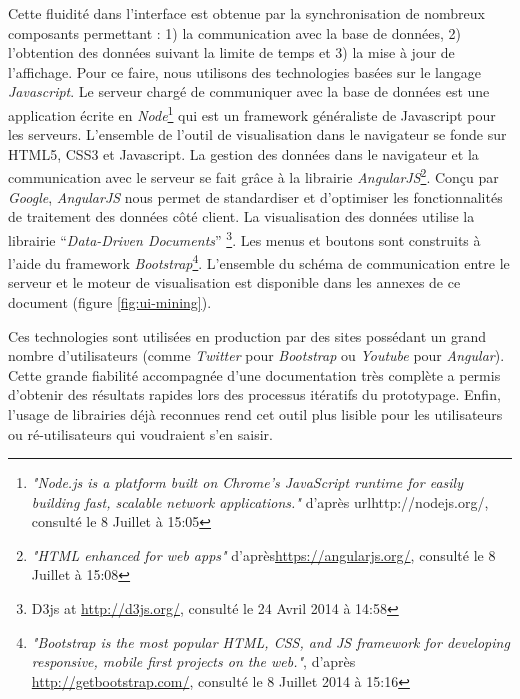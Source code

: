     Cette fluidité dans l'interface est obtenue par la  synchronisation de nombreux composants permettant : 1) la communication avec la base de données, 2) l'obtention des données suivant la limite de temps et 3) la mise à jour de l'affichage. Pour ce faire, nous utilisons des technologies basées sur le langage \textit{Javascript}. Le serveur chargé de communiquer avec la base de données est une application écrite en \textit{Node}\footnote{ \textit{"Node.js is a platform built on Chrome's JavaScript runtime for easily building fast, scalable network applications."} d'après url{http://nodejs.org/}, consulté le 8 Juillet à 15:05} qui est un framework généraliste de Javascript pour les serveurs. L{\textquoteright}ensemble de l{\textquoteright}outil de visualisation dans le navigateur se fonde sur HTML5, CSS3 et Javascript. La gestion des données dans le navigateur et la communication avec le serveur se fait grâce à la librairie \textit{AngularJS}\footnote{\textit{"HTML enhanced for web apps"} d'après\url{https://angularjs.org/}, consulté le 8 Juillet à 15:08}. Conçu par \textit{Google}, \textit{AngularJS} nous permet de standardiser et d'optimiser les fonctionnalités de traitement des données côté client. La visualisation des données utilise la librairie {\textquotedblleft}\textit{Data-Driven Documents}{\textquotedblright} \citep{Bostock2011}\footnote{ D3js at \url{http://d3js.org/,} consulté le 24 Avril 2014 à 14:58}. Les menus et boutons sont construits à l'aide du framework \textit{Bootstrap}\footnote{\textit{"Bootstrap is the most popular HTML, CSS, and JS framework for developing responsive, mobile first projects on the web."}, d'après \url{http://getbootstrap.com/}, consulté le 8 Juillet 2014 à 15:16}. L'ensemble du schéma de communication entre le serveur et le moteur de visualisation est disponible dans les annexes de ce document (figure \ref{fig:ui-mining}).

    Ces technologies sont utilisées en production par des sites possédant un grand nombre d'utilisateurs (comme \textit{Twitter} pour \textit{Bootstrap} ou \textit{Youtube} pour \textit{Angular}). Cette grande fiabilité accompagnée d'une documentation très complète a permis d'obtenir des résultats rapides lors des processus itératifs du prototypage. Enfin, l'usage de librairies déjà reconnues rend cet outil plus lisible pour les utilisateurs ou ré-utilisateurs qui voudraient s'en saisir.